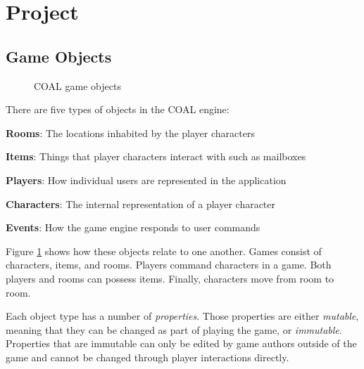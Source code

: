 \documentclass{article}
\newcommand{\enterProblemHeader}[1]{
}
\newcommand{\exitProblemHeader}[1]{
\nobreak\extramarks{#1}{}\nobreak
}
\newcounter{homeworkProblemCounter} %
\newcommand{\homeworkProblemName}{}
\newenvironment{homeworkProblem}[1][Problem \arabic{homeworkProblemCounter}]{ %
\stepcounter{homeworkProblemCounter} %
\renewcommand{\homeworkProblemName}{#1} %
\section{\homeworkProblemName} %
\enterProblemHeader{\homeworkProblemName} %
}{
\exitProblemHeader{\homeworkProblemName} %
}
\newcommand{\homeworkSectionName}{}
\newenvironment{homeworkSection}[1]{ %
\renewcommand{\homeworkSectionName}{#1} %
\subsection{\homeworkSectionName} %
\enterProblemHeader{\homeworkProblemName\ [\homeworkSectionName]} %
}{
\enterProblemHeader{\homeworkProblemName} %
}
\begin{document}
\begin{homeworkProblem}[Project]
\begin{homeworkSection}{Game Objects}
	\begin{figure}
		\centering
		\caption{COAL game objects}
		\label{fig:game-objects}
		\end{figure}

	There are five types of objects in the COAL engine:
	\begin{compactitem}
		\item \textbf{Rooms}: The locations inhabited by the player characters
		\item \textbf{Items}: Things that player characters interact with such as mailboxes
		\item \textbf{Players}: How individual users are represented in the application
		\item \textbf{Characters}: The internal representation of a player character
		\item \textbf{Events}: How the game engine responds to user commands
	\end{compactitem}

	Figure \ref{fig:game-objects} shows how these objects relate to one another. Games consist of characters, items, and rooms. Players command characters in a game. Both players and rooms can possess items. Finally, characters move from room to room.

	Each object type has a number of \textit{properties}. Those properties are either \textit{mutable}, meaning that they can be changed as part of playing the game, or \textit{immutable}. Properties that are immutable can only be edited by game authors outside of the game and cannot be changed through player interactions directly.


\end{homeworkSection}
\end{homeworkProblem}
\end{document}
